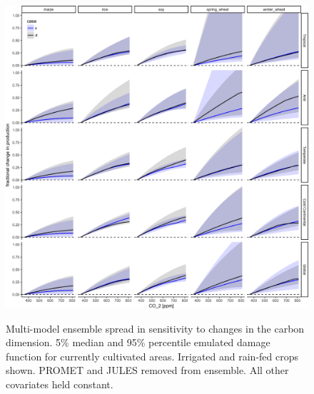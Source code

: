 \documentclass[10pt]{article}
\begin{document}
{\begin{figure}[h!]
\includegraphics[width=\textwidth]{s_carbon.png}\\
\caption{Multi-model ensemble spread in sensitivity to changes in the carbon dimension. 5\% median and 95\% percentile emulated damage function for currently cultivated areas. Irrigated and rain-fed crops shown. PROMET and JULES removed from ensemble. All other covariates held constant.}
\label{fig:carbon}
\end{figure}

}
\end{document}
